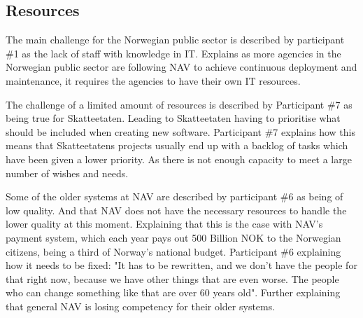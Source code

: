 

\subsection{Resources} \label{sec:resources}
The main challenge for the Norwegian public sector is described by participant \#1 as the lack of staff with knowledge in IT. Explains as more agencies in the Norwegian public sector are following NAV to achieve continuous deployment and maintenance, it requires the agencies to have their own IT resources.


The challenge of a limited amount of resources is described by Participant \#7 as being true for Skatteetaten. Leading to Skatteetaten having to prioritise what should be included when creating new software. Participant \#7 explains how this means that  Skatteetatens projects usually end up with a backlog of tasks which have been given a lower priority. As there is not enough capacity to meet a large number of wishes and needs.


Some of the older systems at NAV are described by participant \#6 as being of low quality. And that NAV does not have the necessary resources to handle the lower quality at this moment. Explaining that this is the case with NAV's payment system, which each year pays out 500 Billion NOK to the Norwegian citizens, being a third of Norway's national budget. Participant \#6 explaining how it needs to be fixed: "It has to be rewritten, and we don't have the people for that right now, because we have other things that are even worse. The people who can change something like that are over 60 years old". Further explaining that general NAV is losing competency for their older systems.

